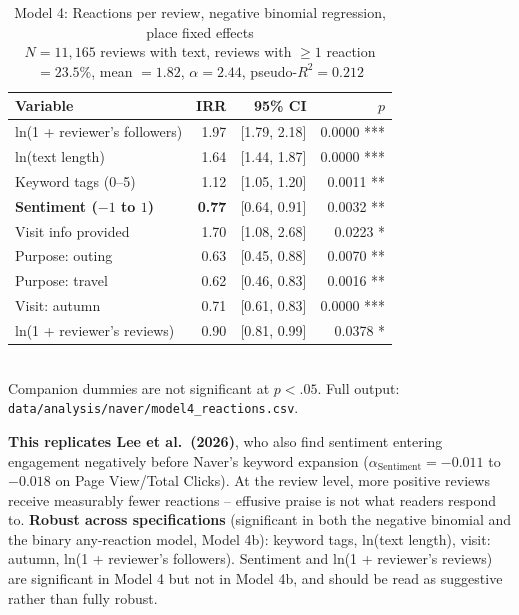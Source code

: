 \documentclass[10pt,a4paper]{article}
\begin{document}
\begin{table}[H]\centering
\caption{Model 4: Reactions per review, negative binomial regression, place fixed effects\\
\footnotesize $N = 11{,}165$ reviews with text, reviews with $\geq 1$ reaction $= 23.5\%$, mean $= 1.82$, $\alpha = 2.44$, pseudo-$R^2 = 0.212$}
\footnotesize
\begin{tabular}{@{}lrrr@{}}
\toprule
Variable & IRR & 95\% CI & $p$ \\
\midrule
ln(1 + reviewer's followers) & 1.97 & [1.79, 2.18] & 0.0000 *** \\
ln(text length)               & 1.64 & [1.44, 1.87] & 0.0000 *** \\
Keyword tags (0--5)            & 1.12 & [1.05, 1.20] & 0.0011 ** \\
\textbf{Sentiment ($-1$ to $1$)} & \textbf{0.77} & [0.64, 0.91] & 0.0032 ** \\
Visit info provided             & 1.70 & [1.08, 2.68] & 0.0223 * \\
Purpose: outing                  & 0.63 & [0.45, 0.88] & 0.0070 ** \\
Purpose: travel                    & 0.62 & [0.46, 0.83] & 0.0016 ** \\
Visit: autumn                        & 0.71 & [0.61, 0.83] & 0.0000 *** \\
ln(1 + reviewer's reviews)         & 0.90 & [0.81, 0.99] & 0.0378 * \\
\bottomrule
\end{tabular}
\\[3pt]
{\scriptsize Companion dummies are not significant at $p<.05$. Full output: \texttt{data/analysis/naver/model4\_reactions.csv}.}
\end{table}

\textbf{This replicates Lee et al.\ (2026)}, who also find sentiment entering
engagement negatively before Naver's keyword expansion ($\alpha_{\text{Sentiment}}
= -0.011$ to $-0.018$ on Page View/Total Clicks). At the review level, more
positive reviews receive measurably fewer reactions -- effusive praise is not
what readers respond to. \textbf{Robust across specifications} (significant
in both the negative binomial and the binary any-reaction model, Model 4b):
keyword tags, ln(text length), visit: autumn, ln(1 + reviewer's followers).
Sentiment and ln(1 + reviewer's reviews) are significant in Model 4 but not
in Model 4b, and should be read as suggestive rather than fully robust.
\end{document}
